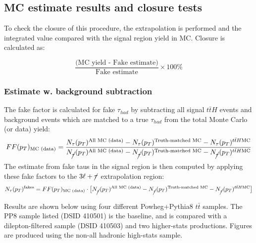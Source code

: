 \documentclass[11pt]{article}
\begin{document}
	
	\clearpage
	\subsection{MC estimate results and closure tests} 
	 To check the closure of this procedure, the extrapolation is performed and the integrated value compared with the signal region yield in MC. Closure is calculated as:

	\begin{equation}
		\frac{\text{(MC yield - Fake estimate)}}{\text{Fake estimate}}\times100\%
	\end{equation} 

	\subsubsection{Estimate w. background subtraction} 
	The fake factor is calculated for fake $\tau_{had}$ by subtracting all signal $t\bar{t}H$ events and background events which are matched to a true $\tau_{had}$ from the total Monte Carlo (or data) yield: 
	\begin{equation}
		FF(p_T)_{\text{MC (data)}} = \frac{N_\tau (p_T)^{\text{All MC (data)}} - N_\tau (p_T)^{\text{Truth-matched MC}} - N_\tau (p_T)^{t\bar{t}H \text{MC}} }{N_{\cancel{\tau}} (p_T)^{\text{All MC (data)}} - N_{\cancel{\tau}} (p_T)^{\text{Truth-matched MC}} - N_{\cancel{\tau}} (p_T)^{t\bar{t}H \text{MC}} }
	\end{equation}
	The estimate from fake taus in the signal region is then computed by applying these fake factors to the $3\ell+\cancel{\tau}$ extrapolation region: 
	\begin{equation}
		N_{\tau} (p_T)^{\text{fakes}} = FF(p_T)_{\text{MC (data)}}\cdot\big[N_{\cancel{\tau}} (p_T)^{\text{All MC (data)}} - N_{\cancel{\tau}} (p_T)^{\text{Truth-matched MC}} - N_{\cancel{\tau}} (p_T)^{t\bar{t}H \text{MC}} \big]
	\end{equation}
	
	Results are shown below using four different Powheg+Pythia8 $t\bar{t}$ samples. The PP8 sample listed (DSID 410501) is the baseline, and is compared with a dilepton-filtered sample (DSID 410503) and two higher-stats productions. Figures are produced using the non-all hadronic high-stats sample. 
\end{document}
